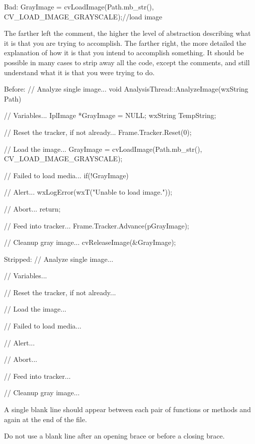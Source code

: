 Bad:
\startCodeExample
GrayImage = cvLoadImage(Path.mb_str(), CV_LOAD_IMAGE_GRAYSCALE);//load image
\stopCodeExample

\item
The farther left the comment, the higher the level of abstraction describing what it is that you are trying to accomplish. The farther right, the more detailed the explanation of how it is that you intend to accomplish something. It should be possible in many cases to strip away all the code, except the comments, and still understand what it is that you were trying to do.

Before:
\startCodeExample
// Analyze single image...
void AnalysisThread::AnalyzeImage(wxString Path)
{
    // Variables...
    IplImage   *GrayImage   = NULL;
    wxString    TempString;

    // Reset the tracker, if not already...
    Frame.Tracker.Reset(0);

    // Load the image...
    GrayImage = cvLoadImage(Path.mb_str(), CV_LOAD_IMAGE_GRAYSCALE);

        // Failed to load media...
        if(!GrayImage)
        {
            // Alert...
            wxLogError(wxT("Unable to load image."));
            
            // Abort...
            return;
        }

    // Feed into tracker...
    Frame.Tracker.Advance(pGrayImage);
    
    // Cleanup gray image...
    cvReleaseImage(&GrayImage);
}
\stopCodeExample

Stripped:
\startCodeExample
// Analyze single image...

    // Variables...

    // Reset the tracker, if not already...

    // Load the image...

        // Failed to load media...

            // Alert...

            // Abort...

    // Feed into tracker...
    
    // Cleanup gray image...
\stopCodeExample

\item
A single blank line should appear between each pair of functions or methods and again at the end of the file.

\item
Do not use a blank line after an opening brace or before a closing brace.


